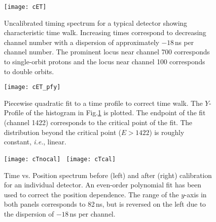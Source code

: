 \begin{figure}[hb]
\centering
\texttt{[image: cET]}%
\caption[Uncalibrated time spectrum for a typical detector showing time walk]{Uncalibrated timing spectrum for a typical detector showing characteristic time walk.  Increasing times correspond to decreasing channel number with a dispersion of approximately $-18$\,ns per channel number.  The prominent locus near channel 700 corresponds to single-orbit protons and the locus near channel 100 corresponds to double orbits.}%
\label{time_plot}%
\end{figure}

\begin{figure}[p]
\centering
\texttt{[image: cET\_pfy]}
\caption[Piecewise quadratic fit to a time profile to correct time walk]{Piecewise quadratic fit to a time profile to correct time walk.  The $Y$-Profile of the histogram in Fig.\ref{time_plot} is plotted.  The endpoint of the fit (channel 1422) corresponds to the critical point of the fit.  The distribution beyond the critical point ($E>1422$) is roughly constant, \textit{i.e.}, linear.}%
\label{time_fit}%
\end{figure}

\begin{figure}[p]
\centering
\texttt{[image: cTnocal]}~
\texttt{[image: cTcal]}\\
\caption[Time vs. position spectrum before (left) and after (right) calibration]{Time vs. Position spectrum before (left) and after (right) calibration for an individual detector.  An even-order polynomial fit has been used to correct the position dependence.  The range of the $y$-axis in both panels corresponds to 82\,ns, but is reversed on the left due to the dispersion of $-18$\,ns per channel.}%
\label{time_cal}%
\end{figure}